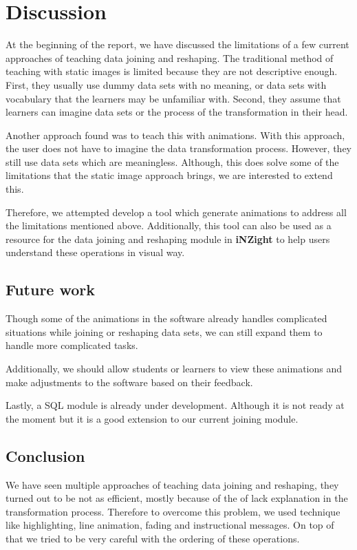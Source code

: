 %
\chapter{Discussion} \label{c6}

At the beginning of the report, we have discussed the limitations of a few current approaches of teaching data joining and reshaping. The traditional method of teaching with static images is limited because they are not descriptive enough. First, they usually use dummy data sets with no meaning, or data sets with vocabulary that the learners may be unfamiliar with. Second, they assume that learners can imagine data sets or the process of the transformation in their head.

Another approach found was to teach this with animations. With this approach, the user does not have to imagine the data transformation process. However, they still use data sets which are meaningless. Although, this does solve some of the limitations that the static image approach brings, we are interested to extend this.

Therefore, we attempted develop a tool which generate animations to address all the limitations mentioned above. Additionally, this tool can also be used as a resource for the data joining and reshaping module in \textbf{iNZight} to help users understand these operations in visual way.


\section{Future work}
Though some of the animations in the software already handles complicated situations while joining or reshaping data sets, we can still expand them to handle more complicated tasks. 

Additionally, we should allow students or learners to view these animations and make adjustments to the software based on their feedback.

Lastly, a \textsf{SQL} module is already under development. Although it is not ready at the moment but it is a good extension to our current joining module. 



\section{Conclusion}
We have seen multiple approaches of teaching data joining and reshaping, they turned out to be not as efficient, mostly because of the of lack explanation in the transformation process. Therefore to overcome this problem, we used technique like highlighting, line animation, fading and instructional messages. On top of that we tried to be very careful with the ordering of these operations. 

